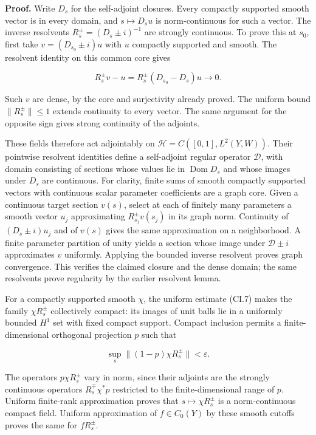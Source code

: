 \documentclass[
  11pt,
]{article}
\begin{document}
\textbf{Proof.} Write \(D_s\) for the self-adjoint closures. Every
compactly supported smooth vector is in every domain, and
\(s\mapsto D_su\) is norm-continuous for such a vector. The inverse
resolvents \(R_s^\pm=(D_s\pm i)^{-1}\) are strongly continuous. To prove
this at \(s_0\), first take \(v=(D_{s_0}\pm i)u\) with \(u\) compactly
supported and smooth. The resolvent identity on this common core gives

\[
 R_s^\pm v-u=R_s^\pm(D_{s_0}-D_s)u\longrightarrow0.
 \tag{CI.17}
\]

Such \(v\) are dense, by the core and surjectivity already proved. The
uniform bound \(\|R_s^\pm\|\leq1\) extends continuity to every vector.
The same argument for the opposite sign gives strong continuity of the
adjoints.

These fields therefore act adjointably on
\(\mathcal H=C([0,1],L^2(Y,W))\). Their pointwise resolvent identities
define a self-adjoint regular operator \(\mathcal D\), with domain
consisting of sections whose values lie in \(\operatorname{Dom}D_s\) and
whose images under \(D_s\) are continuous. For clarity, finite sums of
smooth compactly supported vectors with continuous scalar parameter
coefficients are a graph core. Given a continuous target section
\(v(s)\), select at each of finitely many parameters a smooth vector
\(u_j\) approximating \(R_{s_j}^\pm v(s_j)\) in its graph norm.
Continuity of \((D_s\pm i)u_j\) and of \(v(s)\) gives the same
approximation on a neighborhood. A finite parameter partition of unity
yields a section whose image under \(\mathcal D\pm i\) approximates
\(v\) uniformly. Applying the bounded inverse resolvent proves graph
convergence. This verifies the claimed closure and the dense domain; the
same resolvents prove regularity by the earlier resolvent lemma.

For a compactly supported smooth \(\chi\), the uniform estimate (CI.7)
makes the family \(\chi R_s^\pm\) collectively compact: its images of
unit balls lie in a uniformly bounded \(H^1\) set with fixed compact
support. Compact inclusion permits a finite-dimensional orthogonal
projection \(p\) such that

\[
 \sup_s\|(1-p)\chi R_s^\pm\|<\varepsilon.
\]

The operators \(p\chi R_s^\pm\) vary in norm, since their adjoints are
the strongly continuous operators \(R_s^\mp\chi^*p\) restricted to the
finite-dimensional range of \(p\). Uniform finite-rank approximation
proves that \(s\mapsto\chi R_s^\pm\) is a norm-continuous compact field.
Uniform approximation of \(f\in C_0(Y)\) by these smooth cutoffs proves
the same for \(fR_s^\pm\).
\end{document}
